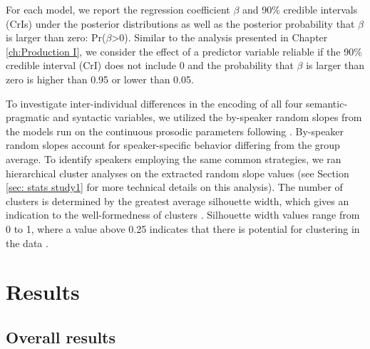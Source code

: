 For each model, we report the regression coefficient $\beta$ and 90\% credible intervals (CrIs) under the posterior distributions as well as the posterior probability that $\beta$ is larger than zero: Pr($\beta$\textgreater{}0). Similar to the analysis presented in Chapter \ref{ch:Production I}, we consider the effect of a predictor variable reliable if the 90\% credible interval (CrI) does not include 0 and the probability that $\beta$ is larger than zero is higher than 0.95 or lower than 0.05. 

To investigate inter-individual differences in the encoding of all four semantic-pragmatic and syntactic variables, we utilized the by-speaker random slopes from the models run on the continuous prosodic parameters following \citet{baumannWhatMakesWord2018}.
By-speaker random slopes account for speaker-specific behavior differing from the group average. To identify speakers employing the same common strategies, we ran hierarchical cluster analyses on the extracted random slope values (see Section \ref{sec: stats study1} for more technical details on this analysis). The number of clusters is determined by the greatest average silhouette width, which gives an indication to the well-formedness of clusters \citep[see][]{levshinaHowLinguisticsData2015}. Silhouette width values range from 0 to 1, where a value above 0.25 indicates that there is potential for clustering in the data \citep[88]{kaufmanFindingGroupsData1990}.

\section{Results} \label{sec:Production2 results}

\subsection{Overall results} \label{sec:Production2 overall results}

